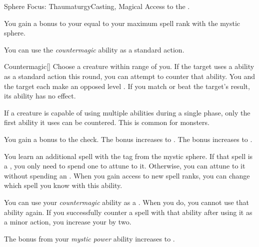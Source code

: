     \begin{feat}{Sphere Focus: Thaumaturgy}{Casting, Magical}
        \featpre Access to the  .

         You gain a bonus to your  equal to your maximum spell rank with the  mystic sphere.

         You can use the \textit{countermagic} ability as a standard action.
        \begin{activeability}{Countermagic}[]
            \rankline
            Choose a creature within \rngmed range of you.
            If the target uses a  ability as a standard action this round, you can attempt to counter that ability.
            You and the target each make an opposed level .
            If you match or beat the target's result, its ability has no effect.

            If a creature is capable of using multiple abilities during a single phase, only the first ability it uses can be countered.
            This is common for  monsters.

            \rankline
             You gain a  bonus to the check.
             The bonus increases to .
             The bonus increases to .
        \end{activeability}

         You learn an additional spell with the  tag from the  mystic sphere.
        If that spell is a , you only need to spend one  to attune to it.
        Otherwise, you can attune to it without spending an .
        When you gain access to new spell ranks, you can change which spell you know with this ability.

         You can use your \textit{countermagic} ability as a .
        When you do, you  cannot use that ability again.
        If you successfully counter a spell with that ability after using it as a minor action, you increase your  by two.

         The bonus from your \textit{mystic power} ability increases to .
    \end{feat}

